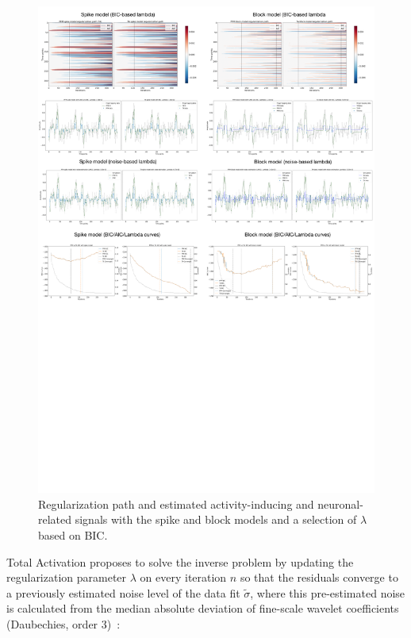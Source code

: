 \begin{figure}[t!]
    \begin{center}
        \includegraphics[width=\textwidth]{figures/exp.pdf}
    \end{center}
    \caption{Regularization path and estimated activity-inducing and neuronal-related signals with the spike and block models and a selection of \(\lambda\) based on BIC.}
\label{fig:exp}
\end{figure}

Total Activation proposes to solve the inverse problem by updating the regularization parameter \(\lambda\) on every iteration \(n\) so that the residuals converge to a previously estimated noise level of the data fit \(\tilde{\sigma}\), where this pre-estimated noise is calculated from the median absolute deviation of fine-scale wavelet coefficients (Daubechies, order 3)~\cite{karahanouglu2013total}:

